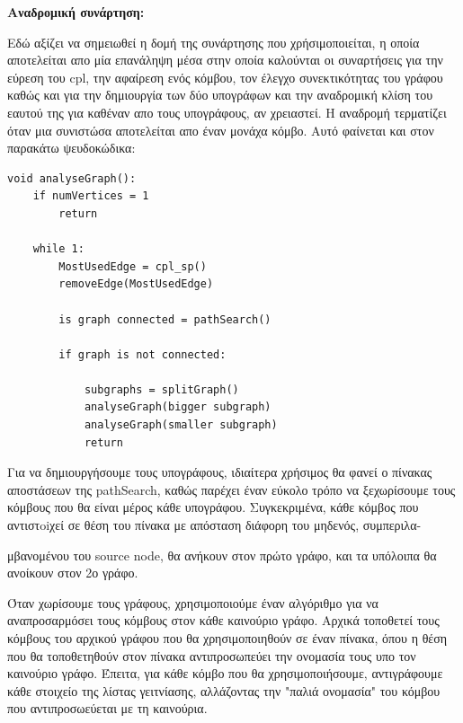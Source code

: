 \documentclass{article}
\begin{document}
\textbf{Αναδρομική συνάρτηση:}\bigbreak

Εδώ αξίζει να σημειωθεί η δομή της συνάρτησης που χρήσιμοποιείται, η οποία αποτελείται απο μία επανάληψη μέσα στην οποία καλούνται οι συναρτήσεις για την εύρεση του
cpl, την αφαίρεση ενός κόμβου, τον έλεγχο συνεκτικότητας του γράφου καθώς και για την δημιουργία των δύο υπογράφων και
την αναδρομική κλίση του εαυτού της για καθέναν απο τους υπογράφους, αν χρειαστεί. Η αναδρομή τερματίζει όταν μια συνιστώσα αποτελείται απο έναν μονάχα κόμβο.
Αυτό φαίνεται και στον παρακάτω ψευδοκώδικα:\bigbreak

\begin{lstlisting}
void analyseGraph():
	if numVertices = 1	
		return
	
	while 1:
		MostUsedEdge = cpl_sp()
		removeEdge(MostUsedEdge)
		
		is graph connected = pathSearch()

		if graph is not connected:
		
			subgraphs = splitGraph()
			analyseGraph(bigger subgraph)								
			analyseGraph(smaller subgraph)				
			return
\end{lstlisting}\bigbreak{}

Για να δημιουργήσουμε τους υπογράφους, ιδιαίτερα χρήσιμος θα φανεί ο πίνακας αποστάσεων της pathSearch,
καθώς παρέχει έναν εύκολο τρόπο να ξεχωρίσουμε τους κόμβους που θα είναι μέρος κάθε υπογράφου. Συγκεκριμένα, κάθε κόμβος που αντιστoiχεί σε θέση του πίνακα
με απόσταση διάφορη του μηδενός, συμπεριλα-

μβανομένου του source node, θα ανήκουν στον πρώτο γράφο, και τα 
υπόλοιπα θα ανοίκουν στον 2ο γράφο.\bigbreak

Όταν χωρίσουμε τους γράφους, χρησιμοποιούμε έναν αλγόριθμο για να αναπροσαρμόσει τους κόμβους στον κάθε καινούριο γράφο. Αρχικά τοποθετεί τους κόμβους του 
αρχικού γράφου που θα χρησιμοποιηθούν σε έναν πίνακα, όπου η θέση που θα τοποθετηθούν στον πίνακα αντιπροσωπεύει την ονομασία τους υπο τον καινούριο γράφο.
Έπειτα, για κάθε κόμβο που θα χρησιμοποιήσουμε, αντιγράφουμε κάθε στοιχείο της λίστας γειτνίασης, αλλάζοντας την "παλιά ονομασία" του κόμβου που αντιπροσωεύεται
με τη καινούρια. \bigbreak
\end{document}
